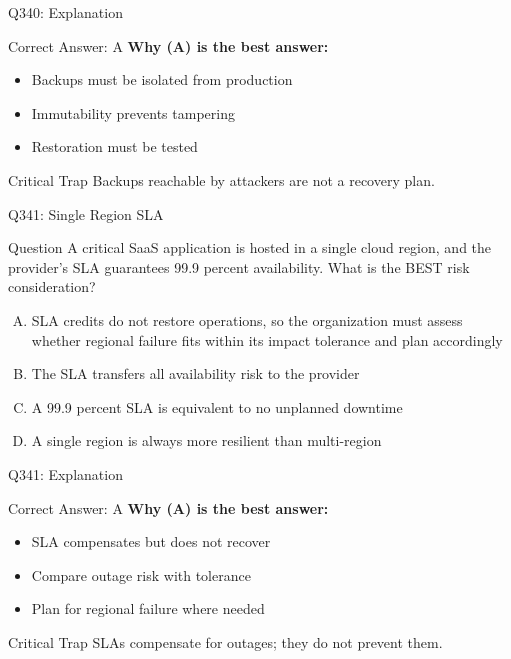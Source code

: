 \documentclass{beamer}
\begin{document}
	\begin{frame}{Q340: Explanation}
		\begin{block}{Correct Answer: A}
			\textbf{Why (A) is the best answer:}
			\begin{itemize}
				\item Backups must be isolated from production
				\item Immutability prevents tampering
				\item Restoration must be tested
			\end{itemize}
		\end{block}
		\begin{alertblock}{Critical Trap}
			Backups reachable by attackers are not a recovery plan.
		\end{alertblock}
	\end{frame}
	
	\begin{frame}{Q341: Single Region SLA}
		\begin{block}{Question}
			\small A critical SaaS application is hosted in a single cloud region, and the provider's SLA guarantees 99.9 percent availability. What is the BEST risk consideration?
		\end{block}
		\begin{enumerate}[(A)]
			\footnotesize
			\item SLA credits do not restore operations, so the organization must assess whether regional failure fits within its impact tolerance and plan accordingly
			\item The SLA transfers all availability risk to the provider
			\item A 99.9 percent SLA is equivalent to no unplanned downtime
			\item A single region is always more resilient than multi-region
		\end{enumerate}
	\end{frame}
	
	\begin{frame}{Q341: Explanation}
		\begin{block}{Correct Answer: A}
			\textbf{Why (A) is the best answer:}
			\begin{itemize}
				\item SLA compensates but does not recover
				\item Compare outage risk with tolerance
				\item Plan for regional failure where needed
			\end{itemize}
		\end{block}
		\begin{alertblock}{Critical Trap}
			SLAs compensate for outages; they do not prevent them.
		\end{alertblock}
	\end{frame}
	
\end{document}

